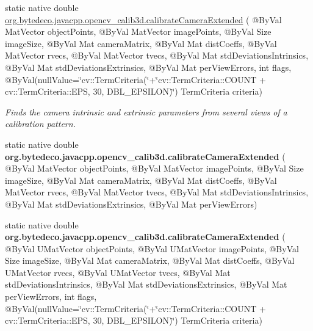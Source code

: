 \begin{DoxyCompactItemize}
\item 
static native double \hyperlink{group__calib3d_ga9829f846450d1022f08716b7c20412d6}{org.\+bytedeco.\+javacpp.\+opencv\+\_\+calib3d.\+calibrate\+Camera\+Extended} ( @By\+Val Mat\+Vector object\+Points, @By\+Val Mat\+Vector image\+Points, @By\+Val Size image\+Size, @By\+Val Mat camera\+Matrix, @By\+Val Mat dist\+Coeffs, @By\+Val Mat\+Vector rvecs, @By\+Val Mat\+Vector tvecs, @By\+Val Mat std\+Deviations\+Intrinsics, @By\+Val Mat std\+Deviations\+Extrinsics, @By\+Val Mat per\+View\+Errors, int flags, @By\+Val(null\+Value=\char`\"{}cv\+::\+Term\+Criteria(\char`\"{}+\char`\"{}cv\+::\+Term\+Criteria\+::\+C\+O\+U\+NT + cv\+::\+Term\+Criteria\+::\+E\+PS, 30, D\+B\+L\+\_\+\+E\+P\+S\+I\+L\+ON)\char`\"{}) Term\+Criteria criteria)
\begin{DoxyCompactList}\small\item\em Finds the camera intrinsic and extrinsic parameters from several views of a calibration pattern. \end{DoxyCompactList}\item 
\mbox{\label{group__calib3d_gad06ea4df020ed03c0227f8d24794d48e}} 
static native double {\bfseries org.\+bytedeco.\+javacpp.\+opencv\+\_\+calib3d.\+calibrate\+Camera\+Extended} ( @By\+Val Mat\+Vector object\+Points, @By\+Val Mat\+Vector image\+Points, @By\+Val Size image\+Size, @By\+Val Mat camera\+Matrix, @By\+Val Mat dist\+Coeffs, @By\+Val Mat\+Vector rvecs, @By\+Val Mat\+Vector tvecs, @By\+Val Mat std\+Deviations\+Intrinsics, @By\+Val Mat std\+Deviations\+Extrinsics, @By\+Val Mat per\+View\+Errors)
\item 
\mbox{\label{group__calib3d_ga6bd6e54ca17d16daa3b7684367592e93}} 
static native double {\bfseries org.\+bytedeco.\+javacpp.\+opencv\+\_\+calib3d.\+calibrate\+Camera\+Extended} ( @By\+Val U\+Mat\+Vector object\+Points, @By\+Val U\+Mat\+Vector image\+Points, @By\+Val Size image\+Size, @By\+Val Mat camera\+Matrix, @By\+Val Mat dist\+Coeffs, @By\+Val U\+Mat\+Vector rvecs, @By\+Val U\+Mat\+Vector tvecs, @By\+Val Mat std\+Deviations\+Intrinsics, @By\+Val Mat std\+Deviations\+Extrinsics, @By\+Val Mat per\+View\+Errors, int flags, @By\+Val(null\+Value=\char`\"{}cv\+::\+Term\+Criteria(\char`\"{}+\char`\"{}cv\+::\+Term\+Criteria\+::\+C\+O\+U\+NT + cv\+::\+Term\+Criteria\+::\+E\+PS, 30, D\+B\+L\+\_\+\+E\+P\+S\+I\+L\+ON)\char`\"{}) Term\+Criteria criteria)
\item 
\mbox{\label{group__calib3d_ga463ca2b4cbf751b167ed378a96c9cb88}} 

\end{DoxyCompactItemize}
